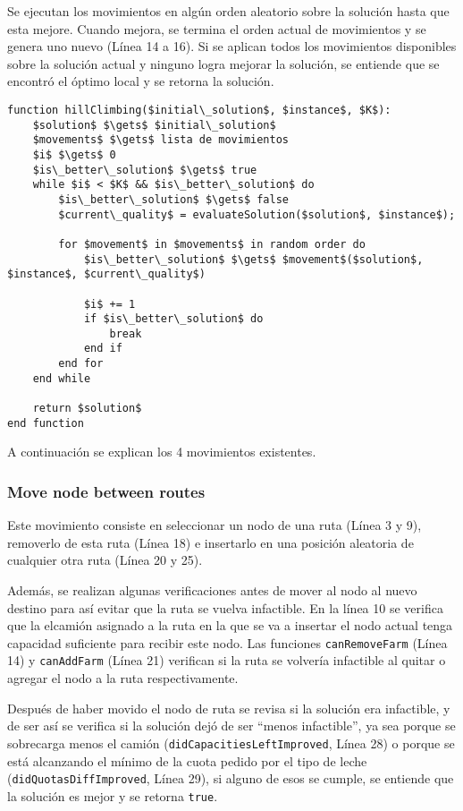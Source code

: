 Se ejecutan los movimientos en algún orden aleatorio sobre la solución hasta que esta mejore. Cuando mejora, se termina el orden actual de movimientos y se genera uno nuevo (Línea 14 a 16). Si se aplican todos los movimientos disponibles sobre la solución actual y ninguno logra mejorar la solución, se entiende que se encontró el óptimo local y se retorna la solución.

\begin{lstlisting}[style=estiloPseudocodigo]
function hillClimbing($initial\_solution$, $instance$, $K$):
    $solution$ $\gets$ $initial\_solution$
    $movements$ $\gets$ lista de movimientos
    $i$ $\gets$ 0
    $is\_better\_solution$ $\gets$ true
    while $i$ < $K$ && $is\_better\_solution$ do
        $is\_better\_solution$ $\gets$ false
        $current\_quality$ = evaluateSolution($solution$, $instance$);

        for $movement$ in $movements$ in random order do
            $is\_better\_solution$ $\gets$ $movement$($solution$, $instance$, $current\_quality$)

            $i$ += 1
            if $is\_better\_solution$ do
                break
            end if
        end for
    end while

    return $solution$
end function
\end{lstlisting}

A continuación se explican los 4 movimientos existentes.

\subsubsection{Move node between routes}

Este movimiento consiste en seleccionar un nodo de una ruta (Línea 3 y 9), removerlo de esta ruta (Línea 18) e insertarlo en una posición aleatoria de cualquier otra ruta (Línea 20 y 25).

Además, se realizan algunas verificaciones antes de mover al nodo al nuevo destino para así evitar que la ruta se vuelva infactible. En la línea 10 se verifica que la elcamión asignado a la ruta en la que se va a insertar el nodo actual tenga capacidad suficiente para recibir este nodo. Las funciones \texttt{canRemoveFarm} (Línea 14) y \texttt{canAddFarm} (Línea 21) verifican si la ruta se volvería infactible al quitar o agregar el nodo a la ruta respectivamente.

Después de haber movido el nodo de ruta se revisa si la solución era infactible, y de ser así se verifica si la solución dejó de ser ``menos infactible'', ya sea porque se sobrecarga menos el camión (\texttt{didCapacitiesLeftImproved}, Línea 28) o porque se está alcanzando el mínimo de la cuota pedido por el tipo de leche (\texttt{didQuotasDiffImproved}, Línea 29), si alguno de esos se cumple, se entiende que la solución es mejor y se retorna \texttt{true}.

